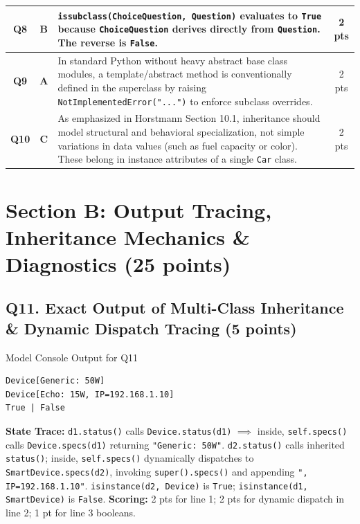 \documentclass[11pt,a4paper]{article}
\begin{document}
\begin{center}
\begin{tabularx}{\textwidth}{|c|c|X|c|}
\textbf{Q8} & \textbf{B} & \texttt{issubclass(ChoiceQuestion, Question)} evaluates to \texttt{True} because \texttt{ChoiceQuestion} derives directly from \texttt{Question}. The reverse is \texttt{False}. & 2 pts \\
\hline
\textbf{Q9} & \textbf{A} & In standard Python without heavy abstract base class modules, a template/abstract method is conventionally defined in the superclass by raising \texttt{NotImplementedError("...")} to enforce subclass overrides. & 2 pts \\
\hline
\textbf{Q10} & \textbf{C} & As emphasized in Horstmann Section 10.1, inheritance should model structural and behavioral specialization, not simple variations in data values (such as fuel capacity or color). These belong in instance attributes of a single \texttt{Car} class. & 2 pts \\
\hline
\end{tabularx}
\end{center}

\newpage
\section*{Section B: Output Tracing, Inheritance Mechanics \& Diagnostics (25 points)}

\subsection*{Q11. Exact Output of Multi-Class Inheritance \& Dynamic Dispatch Tracing (5 points)}
\begin{solbox}{Model Console Output for Q11}
\begin{verbatim}
Device[Generic: 50W]
Device[Echo: 15W, IP=192.168.1.10]
True | False
\end{verbatim}
\end{solbox}
\textbf{State Trace:}
\texttt{d1.status()} calls \texttt{Device.status(d1)} $\implies$ inside, \texttt{self.specs()} calls \texttt{Device.specs(d1)} returning \texttt{"Generic: 50W"}. \texttt{d2.status()} calls inherited \texttt{status()}; inside, \texttt{self.specs()} dynamically dispatches to \texttt{SmartDevice.specs(d2)}, invoking \texttt{super().specs()} and appending \texttt{", IP=192.168.1.10"}. \texttt{isinstance(d2, Device)} is \texttt{True}; \texttt{isinstance(d1, SmartDevice)} is \texttt{False}.\newline
\textbf{Scoring:} 2 pts for line 1; 2 pts for dynamic dispatch in line 2; 1 pt for line 3 booleans.
\end{document}
